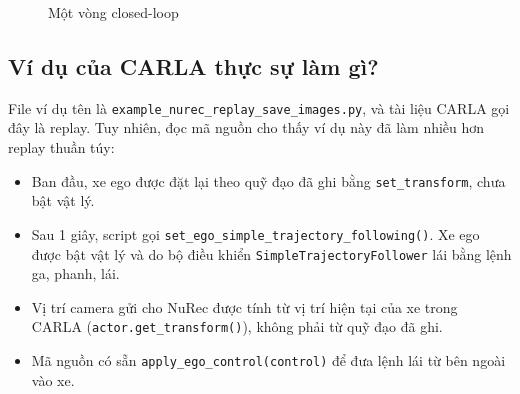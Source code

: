 \begin{figure}[H]
  \centering
  \caption{Một vòng closed-loop}
\end{figure}

\subsection{Ví dụ của CARLA thực sự làm gì?}

File ví dụ tên là \texttt{example\_nurec\_replay\_save\_images.py}, và tài liệu CARLA gọi đây là replay.
Tuy nhiên, đọc mã nguồn cho thấy ví dụ này đã làm nhiều hơn replay thuần túy:

\begin{itemize}
  \item Ban đầu, xe ego được đặt lại theo quỹ đạo đã ghi bằng \texttt{set\_transform}, chưa bật vật lý.
  \item Sau 1 giây, script gọi \texttt{set\_ego\_simple\_trajectory\_following()}. Xe ego được bật vật lý và do bộ điều khiển \texttt{SimpleTrajectoryFollower} lái bằng lệnh ga, phanh, lái.
  \item Vị trí camera gửi cho NuRec được tính từ vị trí hiện tại của xe trong CARLA (\texttt{actor.get\_transform()}), không phải từ quỹ đạo đã ghi.
  \item Mã nguồn có sẵn \texttt{apply\_ego\_control(control)} để đưa lệnh lái từ bên ngoài vào xe.
\end{itemize}

